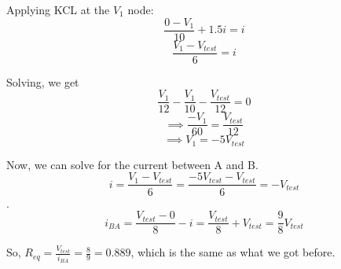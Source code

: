 \begin{enumerate}
{\begin{center}
\begin{circuitikz}
	\end{circuitikz}
	\end{center}

Applying KCL at the $V_1$ node:
$$\frac{0 - V_1}{10} + 1.5i = i$$
$$\frac{V_1 - V_{test}}{6} = i$$

Solving, we get
$$\frac{V_1}{12} - \frac{V_1}{10} - \frac{V_{test}}{12} = 0$$
$$\implies \frac{-V_1}{60} = \frac{V_{test}}{12}$$
$$\implies V_1 = -5V_{test}$$

Now, we can solve for the current between A and B.
$$i = \frac{V_1 - V_{test}}{6} = \frac{-5V_{test} - V_{test}}{6} = -V_{test}$$.
$$i_{BA} = \frac{V_{test} - 0}{8} - i = \frac{V_{test}}{8} + V_{test}= \frac{9}{8}V_{test}$$

So, $R_{eq} = \frac{V_{test}}{i_{BA}} = \frac{8}{9} = 0.889$, which is the same as what we got before.
}



\end{enumerate}
